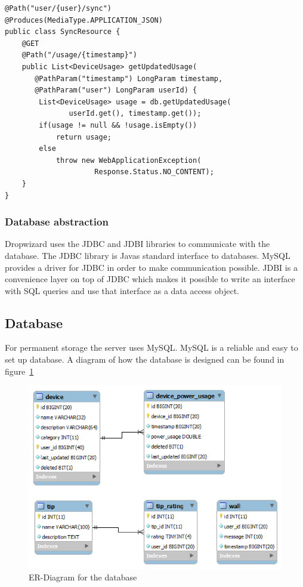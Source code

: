 \begin{lstlisting}[caption={Dropwizard resource example}, label={lst:dropwizardResource}]
@Path("user/{user}/sync")
@Produces(MediaType.APPLICATION_JSON)
public class SyncResource {
    @GET
    @Path("/usage/{timestamp}")
    public List<DeviceUsage> getUpdatedUsage(
	   @PathParam("timestamp") LongParam timestamp, 
	   @PathParam("user") LongParam userId) {
        List<DeviceUsage> usage = db.getUpdatedUsage(
		       userId.get(), timestamp.get());
        if(usage != null && !usage.isEmpty())
            return usage;
        else
            throw new WebApplicationException(
			         Response.Status.NO_CONTENT);
    }
}
\end{lstlisting}

\subsubsection{Database abstraction}
Dropwizard uses the JDBC and JDBI libraries to communicate with the database. The JDBC library is Javas standard interface to databases. MySQL provides a driver for JDBC in order to make communication possible. JDBI is a convenience layer on top of JDBC which makes it possible to write an interface with SQL queries and use that interface as a data access object.

\subsection{Database}
For permanent storage the server uses MySQL. MySQL is a reliable and easy to set up database. A diagram of how the database is designed can be found in figure~\ref{fig:ER-Diagram}

\begin{figure}[H]
\includegraphics[width=\textwidth]{ch/architecture/fig/ER-Diagram.png}
\caption{ER-Diagram for the database}
\label{fig:ER-Diagram}
\end{figure}
